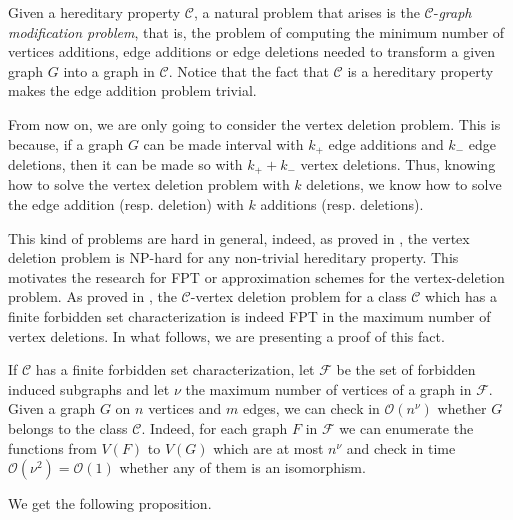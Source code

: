 \documentclass{article}
\theoremstyle{definition}
\begin{document}
    Given a hereditary property $\mathcal{C}$,
    a natural problem that arises
    is the $\mathcal{C}$-\emph{graph modification problem}, 
    that is, the problem of computing the minimum
    number of vertices additions, edge additions or 
    edge deletions needed to transform a given graph $G$ into
    a graph in $\mathcal{C}$. 
    Notice that the fact that $\mathcal{C}$ is 
    a hereditary property
    makes the edge addition problem trivial.
    
    From now on, we are only going 
    to consider the vertex deletion problem. 
    This is because, if a graph $G$ can be made
    interval with $k_{+}$ edge additions
    and $k_{-}$ edge deletions,
    then it can be made so with $k_{+} + k_{-}$ 
    vertex deletions.
    Thus, knowing how to solve
    the vertex deletion problem 
    with $k$ deletions, we know
    how to solve the edge addition
    (resp. deletion) with $k$ 
    additions (resp. deletions).

    This kind of problems are hard in general, indeed, as proved in 
    \cite{NP-hard}, the vertex deletion problem is NP-hard
    for any non-trivial hereditary property.
    This motivates the research for FPT or approximation 
    schemes for the vertex-deletion problem. 
    As proved in \cite{FPT-algos}, the
    $\mathcal{C}$-vertex deletion problem
    for a class $\mathcal{C}$ which has
    a finite forbidden set
    characterization is indeed
    FPT in the maximum number of vertex deletions.
    In what follows, we are presenting a proof of this fact.

    If $\mathcal{C}$ has 
    a finite forbidden set characterization,
    let $\mathcal{F}$ be the set of forbidden induced subgraphs and
    let $\nu$ the maximum number of vertices of a graph in $\mathcal{F}$.
    Given a graph $G$ on $n$ vertices and $m$ edges,
    we can check in $\mathcal{O} \left(n^{\nu}\right)$
    whether $G$ belongs to the class $\mathcal{C}$.
    Indeed, for each graph $F$ in $\mathcal{F}$ 
    we can enumerate the functions from $V\left(F\right)$
    to $V\left(G\right)$ which are at most $n^{\nu}$
    and check in time $\mathcal{O} \left(\nu^{2}\right) = \mathcal{O}\left(1\right)$ whether
    any of them is an isomorphism.

    We get the following proposition.
\end{document}

